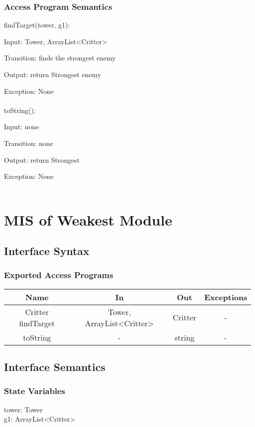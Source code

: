\documentclass[12,english]{article}
\begin{document}
		\subsubsection{Access Program Semantics}
		findTarget(tower, g1):
		
		Input: Tower, ArrayList<Critter>
		
		Transition: finds the strongest enemy
		
		Output: return Strongest enemy
		
		Exception: None\\
		\\
		toString():
		
		Input: none
		
		Transition: none
		
		Output: return Strongest
		
		Exception: None\\
		\\
\section{MIS of Weakest Module}
	\subsection{Interface Syntax}
		\subsubsection{Exported Access Programs}
		
	\begin{tabular}[pos]{|c|c|c|c|}
	\hline
	\textbf{Name}& \textbf{In} & \textbf{Out} & \textbf{Exceptions} \\ 
	\hline
	Critter findTarget & Tower, ArrayList<Critter> & Critter & - \\ \hline
	toString & - & string & - \\ \hline
					
	\end{tabular}		
		
	\subsection{Interface Semantics}
		\subsubsection{State Variables}
		tower: Tower\\
	    g1: ArrayList<Critter>\\
\end{document}
